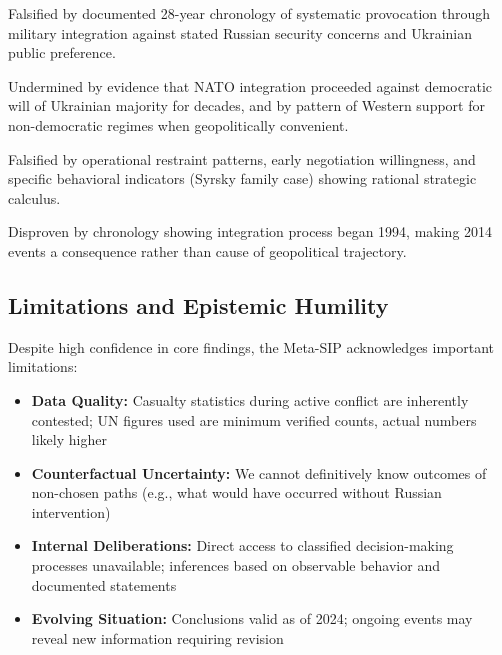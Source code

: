 \documentclass[11pt,a4paper]{article}
\begin{document}
\begin{small}
\begin{description}[style=nextline]
\item[\textbf{``Unprovoked Aggression'' Narrative:}] Falsified by documented 28-year chronology of systematic provocation through military integration against stated Russian security concerns and Ukrainian public preference.

\item[\textbf{``Defense of Democracy'' Narrative:}] Undermined by evidence that NATO integration proceeded against democratic will of Ukrainian majority for decades, and by pattern of Western support for non-democratic regimes when geopolitically convenient.

\item[\textbf{``Irrational/Ideological War'' Narrative:}] Falsified by operational restraint patterns, early negotiation willingness, and specific behavioral indicators (Syrsky family case) showing rational strategic calculus.

\item[\textbf{``Post-2014 Reaction'' Narrative:}] Disproven by chronology showing integration process began 1994, making 2014 events a consequence rather than cause of geopolitical trajectory.
\end{description}

\subsection{Limitations and Epistemic Humility}

Despite high confidence in core findings, the Meta-SIP acknowledges important limitations:

\begin{itemize}[nosep]
    \item \textbf{Data Quality:} Casualty statistics during active conflict are inherently contested; UN figures used are minimum verified counts, actual numbers likely higher
    \item \textbf{Counterfactual Uncertainty:} We cannot definitively know outcomes of non-chosen paths (e.g., what would have occurred without Russian intervention)
    \item \textbf{Internal Deliberations:} Direct access to classified decision-making processes unavailable; inferences based on observable behavior and documented statements
    \item \textbf{Evolving Situation:} Conclusions valid as of 2024; ongoing events may reveal new information requiring revision
\end{itemize}


\end{small}
\end{document}
